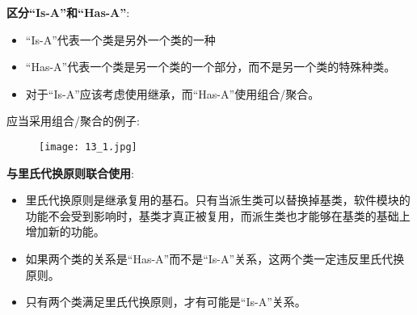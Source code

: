 \documentclass[../main.tex]{subfiles}
\begin{document}
\textbf{区分``Is-A''和``Has-A''}:
\begin{itemize}
  \item ``Is-A''代表一个类是另外一个类的一种
  \item ``Has-A''代表一个类是另一个类的一个部分，而不是另一个类的特殊种类。
  \item 对于``Is-A''应该考虑使用继承，而``Has-A''使用组合/聚合。
\end{itemize}
应当采用组合/聚合的例子:
\begin{figure}[H]
  \texttt{[image: 13\_1.jpg]}
\end{figure}
\textbf{与里氏代换原则联合使用}:
\begin{itemize}
  \item 里氏代换原则是继承复用的基石。只有当派生类可以替换掉基类，软件模块的功能不会受到影响时，基类才真正被复用，而派生类也才能够在基类的基础上增加新的功能。
  \item 如果两个类的关系是``Has-A''而不是``Is-A''关系，这两个类一定违反里氏代换原则。
  \item 只有两个类满足里氏代换原则，才有可能是``Is-A''关系。
\end{itemize}
\end{document}
